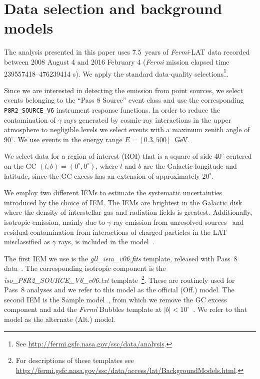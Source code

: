 \documentclass[iop]{emulateapj}
\begin{document}
\section{Data selection and background models}
\label{sec:datasel}
The analysis presented in this paper uses 7.5~years of {\it Fermi}-LAT
data recorded between 2008 August 4 and 2016 February 4 ({\it Fermi}
mission elapsed time 239557418--476239414 s).  We apply the standard
data-quality selections\footnote[2]{See
  \url{http://fermi.gsfc.nasa.gov/ssc/data/analysis}.}.

Since we are interested in detecting the emission from point sources,
we select events belonging to the ``Pass 8 Source'' event class and
use the corresponding \texttt{P8R2\_SOURCE\_V6} instrument response
functions.  In order to reduce the contamination of $\gamma$ rays generated by 
cosmic-ray interactions in the upper atmosphere to negligible levels
we select events with a maximum zenith angle of
$90^{\circ}$. We use events in the energy range $E=[0.3,500]$~GeV.

We select data for a region of interest (ROI) that is a square of side
$40^{\circ}$ centered on the GC $(l,b)=(0^{\circ},0^{\circ})$, where
$l$ and $b$ are the Galactic longitude and latitude, since the GC
excess has an extension of approximately $20^{\circ}$.

We employ two different IEMs to estimate the systematic uncertainties
introduced by the choice of IEM.  The IEMs are brightest in the
Galactic disk where the density of interstellar gas and radiation
fields is greatest.  Additionally, isotropic emission, mainly due to
$\gamma$-ray emission from unresolved sources~\citep[see,
e.g.,][]{DiMauro:2015tfa} and residual contamination from interactions
of charged particles in the LAT misclassified as $\gamma$ rays, is
included in the model~\citep{2015ApJ...799...86A}.

The first IEM we use is the {\it gll\_iem\_v06.fits} template,
released with Pass~8 data~\citep{2016ApJS..223...26A}. The corresponding
isotropic component is the {\it iso\_P8R2\_SOURCE\_V6\_v06.txt}
template~\footnote[3]{For descriptions of these templates see
  \url{http://fermi.gsfc.nasa.gov/ssc/data/access/lat/BackgroundModels.html}.}.
These are routinely used for Pass~8 analyses and we refer to this
model as the official (Off.) model. 
The second IEM is the Sample model~\citep[][Section~2.2]{TheFermi-LAT:2017vmf}, from which we remove the GC excess component 
and add the {\it Fermi} Bubbles template at $|b|<10^{\circ}$~\citep[][Section~5.1.3]{TheFermi-LAT:2017vmf}.  
We refer to that model as the alternate (Alt.) model.
\end{document}
